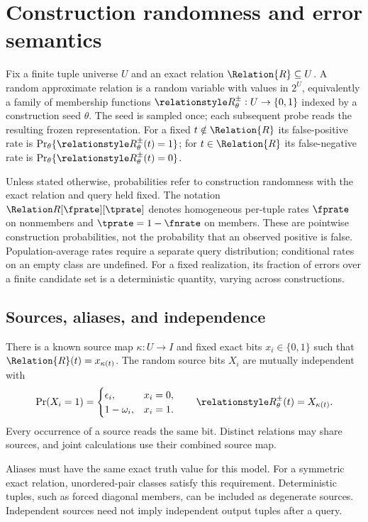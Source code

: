 \documentclass[../main.tex]{subfiles}
\begin{document}
\section{Construction randomness and error semantics}
\label{sec:approx_rel_model}
\begin{definition}
\label{def:approx_rel}
Fix a finite tuple universe $U$ and an exact relation $\Relation{R}\subseteq U$.
A random approximate relation is a random variable with values in
$2^U$, equivalently a family of membership functions
$\ARelation{R}_\theta:U\to\{0,1\}$ indexed by a construction seed $\theta$.
The seed is sampled once; each subsequent probe reads the resulting frozen
representation. For a fixed $t\notin\Relation{R}$ its false-positive rate is
$\Pr_\theta\{\ARelation{R}_\theta(t)=1\}$; for $t\in\Relation{R}$ its
false-negative rate is $\Pr_\theta\{\ARelation{R}_\theta(t)=0\}$.
\end{definition}

Unless stated otherwise, probabilities refer to construction randomness
with the exact relation and query held fixed. The notation
$\ARelation{R}[\fprate][\tprate]$ denotes homogeneous per-tuple rates
$\fprate$ on nonmembers and $\tprate=1-\fnrate$ on members.
These are pointwise construction probabilities, not the probability that
an observed positive is false. Population-average rates require a separate
query distribution; conditional rates on an empty class are undefined.
For a fixed realization, its fraction of errors over a finite candidate set
is a deterministic quantity, varying across constructions.

\subsection{Sources, aliases, and independence}
\label{sec:prob_model}
\begin{assumption}
\label{asm:source_model}
There is a known source map $\kappa:U\to I$ and fixed exact bits
$x_i\in\{0,1\}$ such that $\Relation{R}(t)=x_{\kappa(t)}$.
The random source bits $X_i$ are mutually independent with
\[
 \Pr(X_i=1)=
 \begin{cases}
   \epsilon_i,&x_i=0,\\
   1-\omega_i,&x_i=1.
 \end{cases}
 \qquad \ARelation{R}_\theta(t)=X_{\kappa(t)}.
\]
Every occurrence of a source reads the same bit. Distinct relations may share
sources, and joint calculations use their combined source map.
\end{assumption}
Aliases must have the same exact truth value for this model. For a symmetric
exact relation, unordered-pair classes satisfy this requirement. Deterministic
tuples, such as forced diagonal members, can be included as degenerate sources.
Independent sources need not imply independent output tuples after a query.
\end{document}
